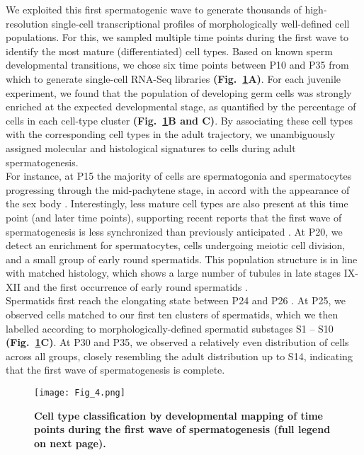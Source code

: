 We exploited this first spermatogenic wave to generate thousands of high-resolution single-cell transcriptional profiles of morphologically well-defined cell populations. For this, we sampled multiple time points during the first wave to identify the most mature (differentiated) cell types. Based on known sperm developmental transitions, we chose six time points between P10 and P35 from which to generate single-cell RNA-Seq libraries \textbf{(Fig.~\ref{fig3:1st_wave}A)}. For each juvenile experiment, we found that the population of developing germ cells was strongly enriched at the expected developmental stage, as quantified by the percentage of cells in each cell-type cluster \textbf{(Fig.~\ref{fig3:1st_wave}B and C)}. By associating these cell types with the corresponding cell types in the adult trajectory, we unambiguously assigned molecular and histological signatures to cells during adult spermatogenesis.\\

For instance, at P15 the majority of cells are spermatogonia and spermatocytes progressing through the mid-pachytene stage, in accord with the appearance of the sex body \citep{Turner2004}. Interestingly, less mature cell types are also present at this time point (and later time points), supporting recent reports that the first wave of spermatogenesis is less synchronized than previously anticipated \citep{Snyder2010}. At P20, we detect an enrichment for spermatocytes, cells undergoing meiotic cell division, and a small group of early round spermatids. This population structure is in line with matched histology, which shows a large number of tubules in late stages IX-XII and the first occurrence of early round spermatids \citep{Bellve1977}.\\
Spermatids first reach the elongating state between P24 and P26 \citep{Janca1986}. At P25, we observed cells matched to our first ten clusters of spermatids, which we then labelled according to morphologically-defined spermatid substages S1 – S10 \textbf{(Fig.~\ref{fig3:1st_wave}C)}. At P30 and P35, we observed a relatively even distribution of cells across all groups, closely resembling the adult distribution up to S14, indicating that the first wave of spermatogenesis is complete. 

\begin{figure}[!h]
\centering
\texttt{[image: Fig\_4.png]}
\caption[Staging of cell types during mouse spermatogenesis]{\textbf{Cell type classification by developmental mapping of time points during the first wave of spermatogenesis (full legend on next page).}}
\label{fig3:1st_wave}
\end{figure}

